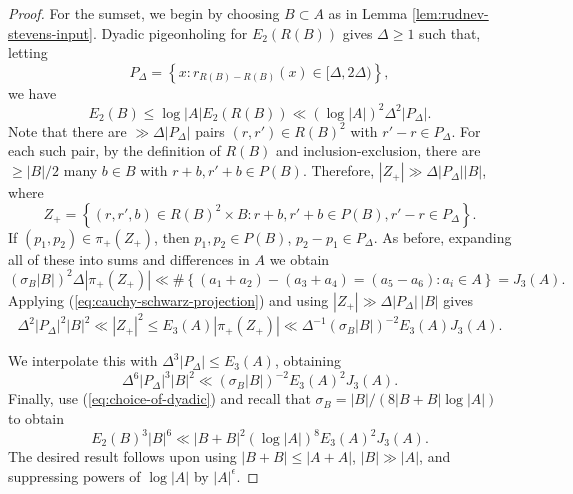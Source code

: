 \documentclass[10pt,a4paper]{amsart}
\newcommand{\De}{\Delta}
\newcommand{\e}{\epsilon}
\begin{document}
\begin{proof}
    \bigskip
    For the sumset, we begin by choosing \(B \subset A\) as in Lemma \ref{lem:rudnev-stevens-input}. Dyadic pigeonholing for \(E_2(R(B))\) gives \(\Delta \geq 1\) such that, letting 
    \[
    P_{\Delta} = \left\{ x : r_{R(B) - R(B)} (x) \in [\Delta, 2 \Delta) \right\},
    \]
    we have
    \begin{equation} 
    \label{eq:choice-of-dyadic}
        E_2(B) \leq \log \left\lvert A \right\rvert E_2(R(B)) \ll \left( \log \left\lvert A \right\rvert  \right) ^{2} \Delta ^{2} \left\lvert P_{\Delta} \right\rvert  .
    \end{equation}
    Note that there are \(\gg \De |P_{\De}|\) pairs \((r,r') \in R(B) ^2\) with \(r'-r \in P_{\De}\). 
    For each such pair, by the definition of \(R(B)\) and inclusion-exclusion, there are \(\geq |B| /2\) many \(b \in B\) with \(r + b, r' + b \in P(B)\). 
    Therefore, \(\left\lvert Z_{+}  \right\rvert \gg \Delta \left\lvert P_{\Delta}  \right\rvert  \left\lvert B \right\rvert \), where
    \[
        Z_{+} = \left\{ (r,r',b)\in R(B)^{2}\times B : r+b,r'+b \in P(B), r'-r \in P_{\Delta}  \right\} 
    .\]
    If \((p_1,p_2) \in \pi_{+} (Z_{+} )\), then \(p_1,p_2 \in P(B)\), \(p_2-p_1 \in P_{\Delta} \). As before, expanding all of these into sums and differences in \(A\) we obtain 
    \[
        \left( \sigma_{B} \left\lvert B \right\rvert  \right) ^{2} \Delta \left\lvert \pi_{+} (Z_{+} )  \right\rvert \ll \# \left\{ (a_1 + a_2) - (a_3 + a_4) = (a_5 - a_6) : a_{i}\in A \right\} = J_3(A)
    .\]
    Applying (\ref{eq:cauchy-schwarz-projection}) and using \(|Z_+| \gg \De |P_{\De}|\, |B|\) gives
    \begin{equation*}
        \Delta ^{2} \left\lvert P_{\Delta} \right\rvert ^{2} \left\lvert B \right\rvert ^{2} \ll \left\lvert Z_{+}  \right\rvert ^{2} \leq E_3(A) \left\lvert \pi_{+} (Z_{+} ) \right\rvert \ll \Delta ^{-1} (\sigma _B |B| ) ^{-2} E_3(A) J_3(A).
    \end{equation*}
    
    We interpolate this with  $\Delta ^{3} \left\lvert P_{\Delta}  \right\rvert \leq E_3(A)$, obtaining 
    \[
    \De ^6 |P_{\De}|^3 |B| ^2 \ll  (\sigma _B |B|)^{-2} E_3(A)^2 J_3(A)
    .\]
    Finally, use (\ref{eq:choice-of-dyadic}) and recall that \(\sigma_B = |B| / (8 |B+B| \log |A|)\) to obtain
    \[
    E_2(B) ^{3} \left\lvert B \right\rvert ^{6} \ll \left\lvert B+B \right\rvert ^{2} \left( \log \left\lvert A \right\rvert  \right) ^{8} E_3(A)^{2} J_3(A)
    .\]
    The desired result follows upon using \(\left\lvert B+B \right\rvert \leq \left\lvert A+A \right\rvert \), \(\left\lvert B \right\rvert \gg \left\lvert A \right\rvert \), and suppressing powers of \(\log \left\lvert A \right\rvert \) by \(\left\lvert A \right\rvert ^{\e}\).
\end{proof}
\end{document}
